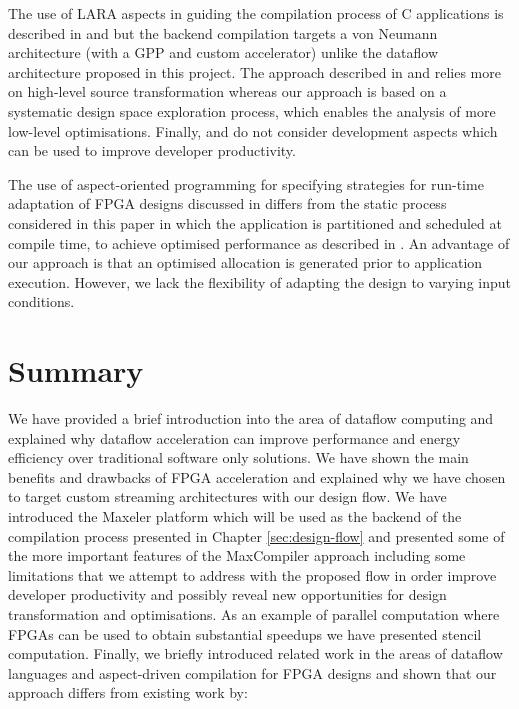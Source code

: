 The use of LARA aspects in guiding the compilation process of C
applications is described in
\cite{Cardoso:Teixeira:Alves:Nobre:Diniz:Cutinho:Luk:2012} and
\cite{cardoso2011new} but the backend compilation targets a von
Neumann architecture (with a GPP and custom accelerator) unlike the
dataflow architecture proposed in this project. The approach described
in \cite{Cardoso:Teixeira:Alves:Nobre:Diniz:Cutinho:Luk:2012} and
\cite{cardoso2011new} relies more on high-level source transformation
whereas our approach is based on a systematic design space exploration
process, which enables the analysis of more low-level
optimisations. Finally,
\cite{Cardoso:Teixeira:Alves:Nobre:Diniz:Cutinho:Luk:2012} and
\cite{cardoso2011new} do not consider development aspects which can be
used to improve developer productivity.


The use of aspect-oriented programming for specifying strategies for
run-time adaptation of FPGA designs discussed in \cite{6322875}
differs from the static process considered in this paper in which the
application is partitioned and scheduled at compile time, to achieve
optimised performance as described in
\cite{Xinyu:Qiwei:Luk:Qiang:Pell:2012}. An advantage of our approach
is that an optimised allocation is generated prior to application
execution. However, we lack the flexibility of adapting the design to
varying input conditions.

\section{Summary}

We have provided a brief introduction into the area of dataflow
computing and explained why dataflow acceleration can improve
performance and energy efficiency over traditional software only
solutions. We have shown the main benefits and drawbacks of FPGA
acceleration and explained why we have chosen to target custom
streaming architectures with our design flow. We have introduced the
Maxeler platform which will be used as the backend of the compilation
process presented in Chapter \ref{sec:design-flow} and presented some
of the more important features of the MaxCompiler approach including
some limitations that we attempt to address with the proposed flow in
order improve developer productivity and possibly reveal new
opportunities for design transformation and optimisations. As an
example of parallel computation where FPGAs can be used to obtain
substantial speedups we have presented stencil computation. Finally,
we briefly introduced related work in the areas of dataflow languages
and aspect-driven compilation for FPGA designs and shown that our
approach differs from existing work by:


